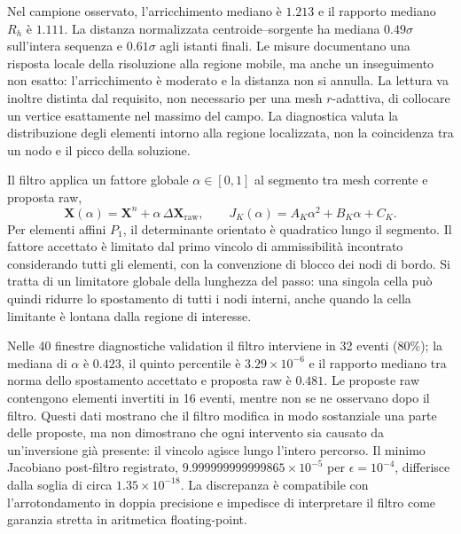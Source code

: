 Nel campione osservato, l'arricchimento mediano è $1.213$ e il rapporto mediano $R_h$ è $1.111$. La distanza normalizzata centroide--sorgente ha mediana $0.49\sigma$ sull'intera sequenza e $0.61\sigma$ agli istanti finali. Le misure documentano una risposta locale della risoluzione alla regione mobile, ma anche un inseguimento non esatto: l'arricchimento è moderato e la distanza non si annulla. La lettura va inoltre distinta dal requisito, non necessario per una mesh $r$-adattiva, di collocare un vertice esattamente nel massimo del campo. La diagnostica valuta la distribuzione degli elementi intorno alla regione localizzata, non la coincidenza tra un nodo e il picco della soluzione.

Il filtro applica un fattore globale $\alpha\in[0,1]$ al segmento tra mesh corrente e proposta raw,
\begin{equation}
\bm X(\alpha)=\bm X^n+\alpha\,\Delta\bm X_{\mathrm{raw}},\qquad
J_K(\alpha)=A_K\alpha^2+B_K\alpha+C_K.
\label{eq:filter_path_polynomial}
\end{equation}
Per elementi affini $P_1$, il determinante orientato è quadratico lungo il segmento. Il fattore accettato è limitato dal primo vincolo di ammissibilità incontrato considerando tutti gli elementi, con la convenzione di blocco dei nodi di bordo. Si tratta di un limitatore globale della lunghezza del passo: una singola cella può quindi ridurre lo spostamento di tutti i nodi interni, anche quando la cella limitante è lontana dalla regione di interesse.

Nelle 40 finestre diagnostiche validation il filtro interviene in 32 eventi ($80\%$); la mediana di $\alpha$ è $0.423$, il quinto percentile è $3.29\times10^{-6}$ e il rapporto mediano tra norma dello spostamento accettato e proposta raw è $0.481$. Le proposte raw contengono elementi invertiti in 16 eventi, mentre non se ne osservano dopo il filtro. Questi dati mostrano che il filtro modifica in modo sostanziale una parte delle proposte, ma non dimostrano che ogni intervento sia causato da un'inversione già presente: il vincolo agisce lungo l'intero percorso. Il minimo Jacobiano post-filtro registrato, $9.999999999999865\times10^{-5}$ per $\epsilon=10^{-4}$, differisce dalla soglia di circa $1.35\times10^{-18}$. La discrepanza è compatibile con l'arrotondamento in doppia precisione e impedisce di interpretare il filtro come garanzia stretta in aritmetica floating-point.

